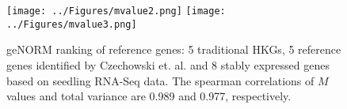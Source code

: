 \documentclass[11pt, a4paper]{article}
\begin{document}
 \begin{figure}[h!]
\begin{center}
\texttt{[image: ../Figures/mvalue2.png]}
\texttt{[image: ../Figures/mvalue3.png]}
\caption{\label{sup:mvalue} geNORM ranking of reference genes: 5 traditional HKGs, 5 reference genes identified by Czechowski et. al. and 8 stably expressed genes based on seedling RNA-Seq data.  The spearman correlations of $M$ values and total variance  are 0.989 and 0.977, respectively. }
\end{center}
\end{figure}


\newpage




\end{document}

